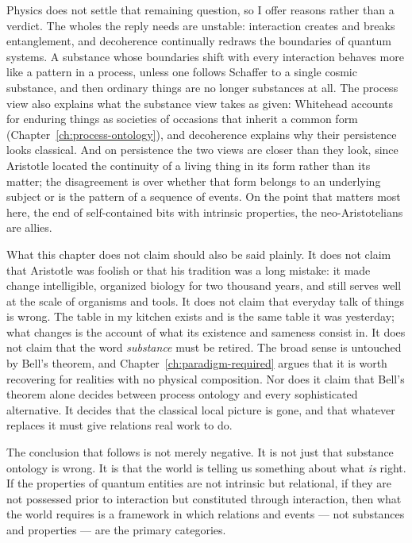 Physics does not settle that remaining question, so I offer reasons rather than a verdict. The wholes the reply needs are unstable: interaction creates and breaks entanglement, and decoherence continually redraws the boundaries of quantum systems. A substance whose boundaries shift with every interaction behaves more like a pattern in a process, unless one follows Schaffer to a single cosmic substance, and then ordinary things are no longer substances at all. The process view also explains what the substance view takes as given: Whitehead accounts for enduring things as societies of occasions that inherit a common form (Chapter~\ref{ch:process-ontology}), and decoherence explains why their persistence looks classical. And on persistence the two views are closer than they look, since Aristotle located the continuity of a living thing in its form rather than its matter; the disagreement is over whether that form belongs to an underlying subject or is the pattern of a sequence of events. On the point that matters most here, the end of self-contained bits with intrinsic properties, the neo-Aristotelians are allies.

What this chapter does not claim should also be said plainly. It does not claim that Aristotle was foolish or that his tradition was a long mistake: it made change intelligible, organized biology for two thousand years, and still serves well at the scale of organisms and tools. It does not claim that everyday talk of things is wrong. The table in my kitchen exists and is the same table it was yesterday; what changes is the account of what its existence and sameness consist in. It does not claim that the word \emph{substance} must be retired. The broad sense is untouched by Bell's theorem, and Chapter~\ref{ch:paradigm-required} argues that it is worth recovering for realities with no physical composition. Nor does it claim that Bell's theorem alone decides between process ontology and every sophisticated alternative. It decides that the classical local picture is gone, and that whatever replaces it must give relations real work to do.

The conclusion that follows is not merely negative. It is not just that substance ontology is wrong. It is that the world is telling us something about what \emph{is} right. If the properties of quantum entities are not intrinsic but relational, if they are not possessed prior to interaction but constituted through interaction, then what the world requires is a framework in which relations and events --- not substances and properties --- are the primary categories.

